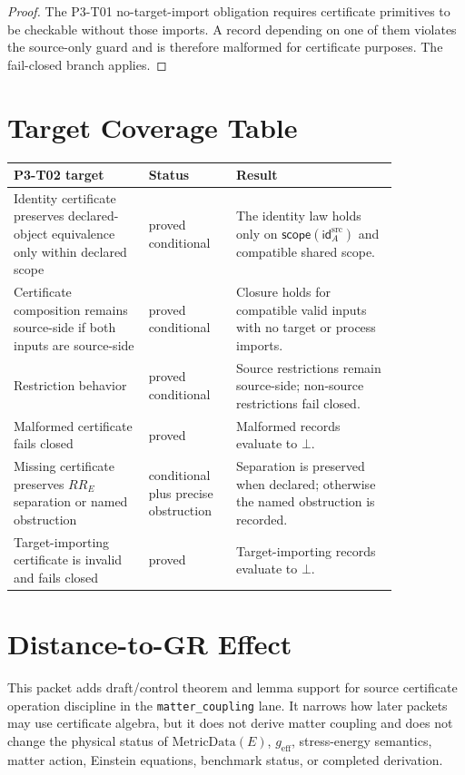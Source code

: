 \documentclass[11pt]{article}
\newcommand{\CId}{\mathsf{id}^{\mathrm{src}}}
\newcommand{\Bottom}{\bot}
\newcommand{\Scope}{\mathsf{scope}}
\newcommand{\MetricData}{\mathrm{MetricData}}
\newcommand{\geff}{g_{\mathrm{eff}}}
\begin{document}
\begin{proof}
The P3-T01 no-target-import obligation requires certificate primitives to be
checkable without those imports. A record depending on one of them violates
the source-only guard and is therefore malformed for certificate purposes.
The fail-closed branch applies.
\end{proof}

\section{Target Coverage Table}

\begin{longtable}{p{0.30\linewidth}p{0.18\linewidth}p{0.36\linewidth}}
\toprule
P3-T02 target & Status & Result \\
\midrule
Identity certificate preserves declared-object equivalence only within
declared scope & proved conditional & The identity law holds only on
\(\Scope(\CId_A)\) and compatible shared scope. \\
Certificate composition remains source-side if both inputs are source-side &
proved conditional & Closure holds for compatible valid inputs with no target
or process imports. \\
Restriction behavior & proved conditional & Source restrictions remain
source-side; non-source restrictions fail closed. \\
Malformed certificate fails closed & proved & Malformed records evaluate to
\(\Bottom\). \\
Missing certificate preserves \(RR_E\) separation or named obstruction &
conditional plus precise obstruction & Separation is preserved when declared;
otherwise the named obstruction is recorded. \\
Target-importing certificate is invalid and fails closed & proved &
Target-importing records evaluate to \(\Bottom\). \\
\bottomrule
\end{longtable}

\section{Distance-to-GR Effect}

This packet adds draft/control theorem and lemma support for source
certificate operation discipline in the \texttt{matter\_coupling} lane. It
narrows how later packets may use certificate algebra, but it does not derive
matter coupling and does not change the physical status of \(\MetricData(E)\),
\(\geff\), stress-energy semantics, matter action, Einstein equations,
benchmark status, or completed derivation.
\end{document}
